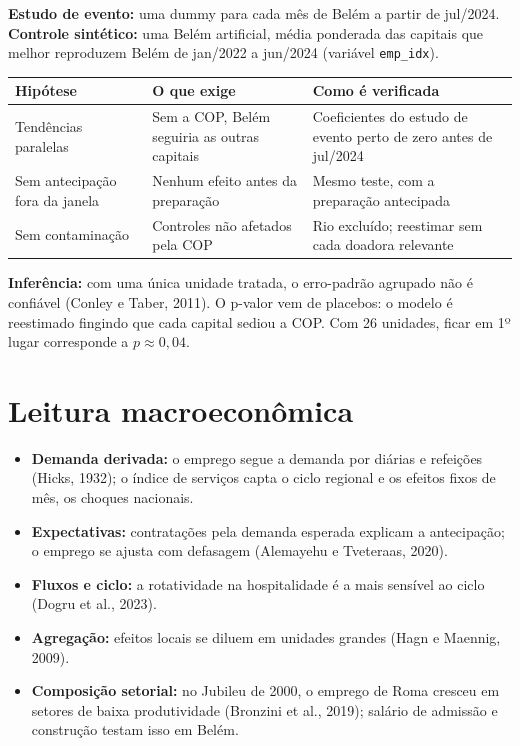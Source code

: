\documentclass[11pt,a4paper]{article}
\newcommand{\var}[1]{\texttt{#1}}
\begin{document}
\textbf{Estudo de evento:} uma dummy para cada mês de Belém a partir de jul/2024.
\textbf{Controle sintético:} uma Belém artificial, média ponderada das capitais que melhor reproduzem
Belém de jan/2022 a jun/2024 (variável \var{emp\_idx}).

\begin{table}[H]
\centering\small
\begin{tabularx}{\linewidth}{p{3.2cm}LL}
\toprule
\textbf{Hipótese} & \textbf{O que exige} & \textbf{Como é verificada}\\
\midrule
Tendências paralelas & Sem a COP, Belém seguiria as outras capitais & Coeficientes do estudo de evento perto de zero antes de jul/2024\\
Sem antecipação fora da janela & Nenhum efeito antes da preparação & Mesmo teste, com a preparação antecipada\\
Sem contaminação & Controles não afetados pela COP & Rio excluído; reestimar sem cada doadora relevante\\
\bottomrule
\end{tabularx}
\end{table}

\textbf{Inferência:} com uma única unidade tratada, o erro-padrão agrupado não é confiável (Conley e
Taber, 2011). O p-valor vem de placebos: o modelo é reestimado fingindo que cada capital sediou a COP.
Com 26 unidades, ficar em 1º lugar corresponde a $p \approx 0{,}04$.

\section{Leitura macroeconômica}

\begin{itemize}
  \item \textbf{Demanda derivada:} o emprego segue a demanda por diárias e refeições (Hicks, 1932); o
        índice de serviços capta o ciclo regional e os efeitos fixos de mês, os choques nacionais.
  \item \textbf{Expectativas:} contratações pela demanda esperada explicam a antecipação; o emprego se
        ajusta com defasagem (Alemayehu e Tveteraas, 2020).
  \item \textbf{Fluxos e ciclo:} a rotatividade na hospitalidade é a mais sensível ao ciclo (Dogru et
        al., 2023).
  \item \textbf{Agregação:} efeitos locais se diluem em unidades grandes (Hagn e Maennig, 2009).
  \item \textbf{Composição setorial:} no Jubileu de 2000, o emprego de Roma cresceu em setores de baixa
        produtividade (Bronzini et al., 2019); salário de admissão e construção testam isso em Belém.
\end{itemize}
\end{document}

